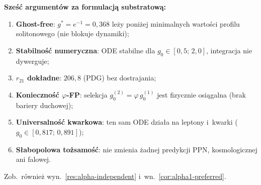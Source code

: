 \begin{remark}[S\l{}ownik formulacji: $K=g^4$ vs $K=g^2$]
\medskip\noindent
\textbf{Sze\'s\'c argument\'ow za formulacj\k{a} substratow\k{a}:}
\begin{enumerate}[nosep]
  \item \textbf{Ghost-free}: $g^* = e^{-1} = 0{,}368$ le\.zy poni\.zej
    minimalnych warto\'sci profilu solitonowego (nie blokuje dynamiki);
  \item \textbf{Stabilno\'s\'c numeryczna}: ODE stabilne dla
    $g_0 \in [0{,}5;\, 2{,}0]$, integracja nie dywerguje;
  \item \textbf{$r_{21}$ dok\l{}adne}: $206{,}8$ (PDG) bez dostrajania;
  \item \textbf{Konieczno\'s\'c $\varphi$-FP}: selekcja
    $g_0^{(2)} = \varphi\,g_0^{(1)}$ jest fizycznie
    osi\k{a}galna (brak bariery duchowej);
  \item \textbf{Universalno\'s\'c kwarkowa}: ten sam ODE dzia\l{}a
    na leptony i~kwarki ($g_0 \in [0{,}817;\, 0{,}891]$);
  \item \textbf{S\l{}abopolowa to\.zsamo\'s\'c}: nie zmienia
    \.zadnej predykcji PPN, kosmologicznej ani falowej.
\end{enumerate}
\noindent
Zob.~r\'ownie\.z wyn.~\ref{res:alpha-independent}
i~wn.~\ref{cor:alpha1-preferred}.
\end{remark}
